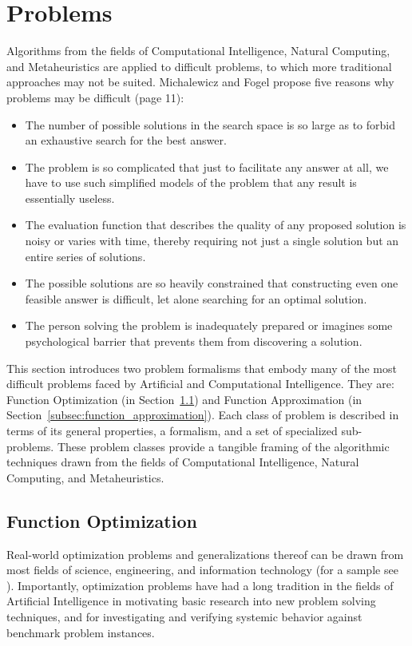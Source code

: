 \section{Problems}
\label{sec:problems}
Algorithms from the fields of Computational Intelligence, Natural Computing, and Metaheuristics are applied to difficult problems, to which more traditional approaches may not be suited.
Michalewicz and Fogel propose five reasons why problems may be difficult \cite{Michalewicz2004} (page 11):
\begin{itemize}
	\item The number of possible solutions in the search space is so large as to forbid an exhaustive search for the best answer.
	\item The problem is so complicated that just to facilitate any answer at all, we have to use such simplified models of the problem that any result is essentially useless.
	\item The evaluation function that describes the quality of any proposed solution is noisy or varies with time, thereby requiring not just a single solution but an entire series of solutions.
	\item The possible solutions are so heavily constrained that constructing even one feasible answer is difficult, let alone searching for an optimal solution.
	\item The person solving the problem is inadequately prepared or imagines some psychological barrier that prevents them from discovering a solution.
\end{itemize}

This section introduces two problem formalisms that embody many of the most difficult problems faced by Artificial and Computational Intelligence. They are: Function Optimization (in Section~\ref{subsec:function_optimization}) and Function Approximation (in Section~\ref{subsec:function_approximation}). Each class of problem is described in terms of its general properties, a formalism, and a set of specialized sub-problems. These problem classes provide a tangible framing of the algorithmic techniques drawn from the fields of Computational Intelligence, Natural Computing, and Metaheuristics.

% 
%
\subsection{Function Optimization}
\label{subsec:function_optimization}
Real-world optimization problems and generalizations thereof can be drawn from most fields of science, engineering, and information technology (for a sample see \cite{Ali1997, Toern1999}). Importantly, optimization problems have had a long tradition in the fields of Artificial Intelligence in motivating basic research into new problem solving techniques, and for investigating and verifying systemic behavior against benchmark problem instances.

